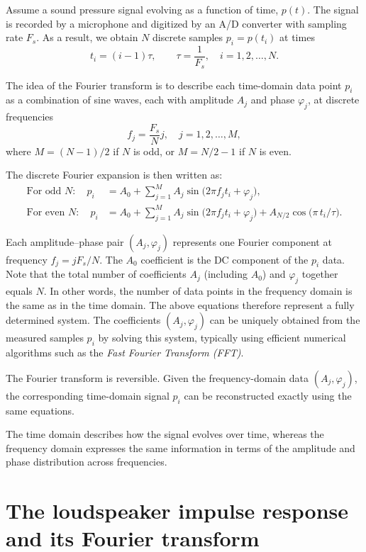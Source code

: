 \documentclass[12pt,a4paper]{article}
\begin{document}
Assume a sound pressure signal evolving as a function of time, $p(t)$. The signal is recorded by a microphone and digitized by an A/D converter with sampling rate \(F_s\). As a result, we obtain $N$ discrete samples $p_i = p(t_i)$ at times
\[
t_i = (i-1)\tau, \qquad \tau = \frac{1}{F_s}, \quad i = 1, 2, \ldots, N.
\]

The idea of the Fourier transform is to describe each time-domain data point \(p_i\)
as a combination of sine waves, each with amplitude \(A_j\) and phase \(\varphi_j\),
at discrete frequencies
\[
f_j = \frac{F_s}{N}j, \quad j = 1, 2, \ldots, M,
\]
where \(M = (N - 1)/2\) if \(N\) is odd, or \(M = N/2 - 1\) if \(N\) is even.

The discrete Fourier expansion is then written as:
\begin{align}
\text{For odd } N:\quad
p_i &= A_0 + \sum_{j=1}^{M} A_j \sin\!\big(2\pi f_j t_i + \varphi_j\big), \\[6pt]
\text{For even } N:\quad
p_i &= A_0 + \sum_{j=1}^{M} A_j \sin\!\big(2\pi f_j t_i + \varphi_j\big)
      + A_{N/2}\cos\!\big(\pi\, t_i / \tau\big).
\end{align}

Each amplitude–phase pair \((A_j, \varphi_j)\) represents one Fourier component at frequency \(f_j = jF_s/N\). The $A_0$ coefficient is the DC component of the $p_i$ data. Note that the total number of coefficients $A_j$ (including $A_0$) and $\varphi_j$ together equals \(N\). In other words, the number of data points in the frequency domain is the same as in the time domain. The above equations therefore represent a fully determined system. The coefficients \((A_j, \varphi_j)\) can be uniquely obtained from the measured samples \(p_i\) by solving this system, typically using efficient numerical algorithms such as the
\emph{Fast Fourier Transform (FFT)}.

The Fourier transform is reversible. Given the frequency-domain data \((A_j, \varphi_j)\),
the corresponding time-domain signal \(p_i\) can be reconstructed exactly using the same equations.

The time domain describes how the signal evolves over time, whereas the frequency domain expresses
the same information in terms of the amplitude and phase distribution across frequencies.


\section{The loudspeaker impulse response and its Fourier transform}
\end{document}
